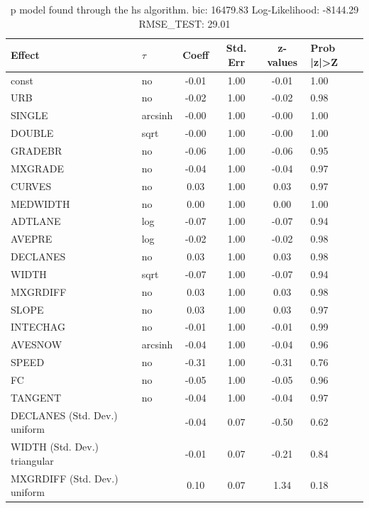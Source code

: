 \begin{table}
	\caption{p model found through the hs algorithm. bic: 16479.83 Log-Likelihood: -8144.29 RMSE_TEST: 29.01}
	\begin{center}
		\begin{tabular}{|l|l|c|c|c|l|}
			\hline
			Effect & $\tau$ & Coeff & Std. Err & z-values & Prob |z|>Z \\
			\hline
			const & no & -0.01 & 1.00 & -0.01 & 1.00 \\
			\hline
			URB & no & -0.02 & 1.00 & -0.02 & 0.98 \\
			\hline
			SINGLE & arcsinh & -0.00 & 1.00 & -0.00 & 1.00 \\
			\hline
			DOUBLE & sqrt & -0.00 & 1.00 & -0.00 & 1.00 \\
			\hline
			GRADEBR & no & -0.06 & 1.00 & -0.06 & 0.95 \\
			\hline
			MXGRADE & no & -0.04 & 1.00 & -0.04 & 0.97 \\
			\hline
			CURVES & no & 0.03 & 1.00 & 0.03 & 0.97 \\
			\hline
			MEDWIDTH & no & 0.00 & 1.00 & 0.00 & 1.00 \\
			\hline
			ADTLANE & log & -0.07 & 1.00 & -0.07 & 0.94 \\
			\hline
			AVEPRE & log & -0.02 & 1.00 & -0.02 & 0.98 \\
			\hline
			DECLANES & no & 0.03 & 1.00 & 0.03 & 0.98 \\
			\hline
			WIDTH & sqrt & -0.07 & 1.00 & -0.07 & 0.94 \\
			\hline
			MXGRDIFF & no & 0.03 & 1.00 & 0.03 & 0.98 \\
			\hline
			SLOPE & no & 0.03 & 1.00 & 0.03 & 0.97 \\
			\hline
			INTECHAG & no & -0.01 & 1.00 & -0.01 & 0.99 \\
			\hline
			AVESNOW & arcsinh & -0.04 & 1.00 & -0.04 & 0.96 \\
			\hline
			SPEED & no & -0.31 & 1.00 & -0.31 & 0.76 \\
			\hline
			FC & no & -0.05 & 1.00 & -0.05 & 0.96 \\
			\hline
			TANGENT & no & -0.04 & 1.00 & -0.04 & 0.97 \\
			\hline
			DECLANES (Std. Dev.) uniform &  & -0.04 & 0.07 & -0.50 & 0.62 \\
			\hline
			WIDTH (Std. Dev.) triangular &  & -0.01 & 0.07 & -0.21 & 0.84 \\
			\hline
			MXGRDIFF (Std. Dev.) uniform &  & 0.10 & 0.07 & 1.34 & 0.18 \\

\end{tabular}
\end{center}
\end{table}
